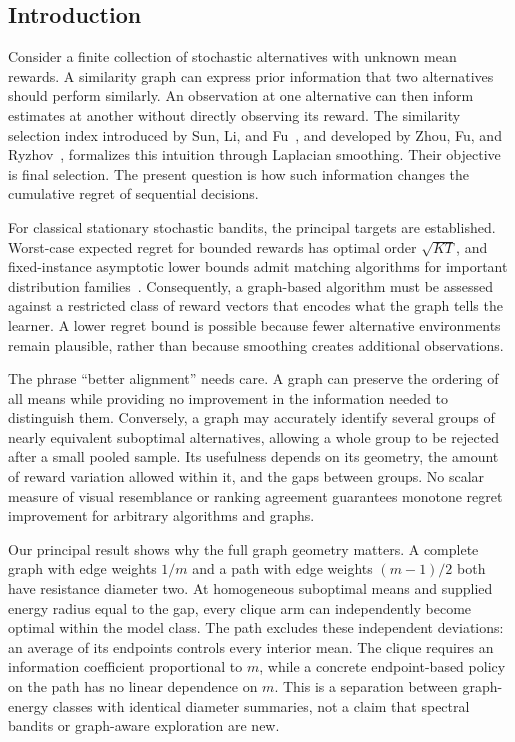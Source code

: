 \subsection{Introduction}
Consider a finite collection of stochastic alternatives with unknown mean rewards. A similarity graph can express prior information that two alternatives should perform similarly. An observation at one alternative can then inform estimates at another without directly observing its reward. The similarity selection index introduced by Sun, Li, and Fu~\cite{collected14}, and developed by Zhou, Fu, and Ryzhov~\cite{collected15}, formalizes this intuition through Laplacian smoothing. Their objective is final selection. The present question is how such information changes the cumulative regret of sequential decisions.

For classical stationary stochastic bandits, the principal targets are established. Worst-case expected regret for bounded rewards has optimal order $\sqrt{KT}$, and fixed-instance asymptotic lower bounds admit matching algorithms for important distribution families~\cite{collected20,collected21,collected22}. Consequently, a graph-based algorithm must be assessed against a restricted class of reward vectors that encodes what the graph tells the learner. A lower regret bound is possible because fewer alternative environments remain plausible, rather than because smoothing creates additional observations.

The phrase ``better alignment'' needs care. A graph can preserve the ordering of all means while providing no improvement in the information needed to distinguish them. Conversely, a graph may accurately identify several groups of nearly equivalent suboptimal alternatives, allowing a whole group to be rejected after a small pooled sample. Its usefulness depends on its geometry, the amount of reward variation allowed within it, and the gaps between groups. No scalar measure of visual resemblance or ranking agreement guarantees monotone regret improvement for arbitrary algorithms and graphs.

Our principal result shows why the full graph geometry matters. A complete graph with edge weights $1/m$ and a path with edge weights $(m-1)/2$ both have resistance diameter two. At homogeneous suboptimal means and supplied energy radius equal to the gap, every clique arm can independently become optimal within the model class. The path excludes these independent deviations: an average of its endpoints controls every interior mean. The clique requires an information coefficient proportional to $m$, while a concrete endpoint-based policy on the path has no linear dependence on $m$. This is a separation between graph-energy classes with identical diameter summaries, not a claim that spectral bandits or graph-aware exploration are new.

